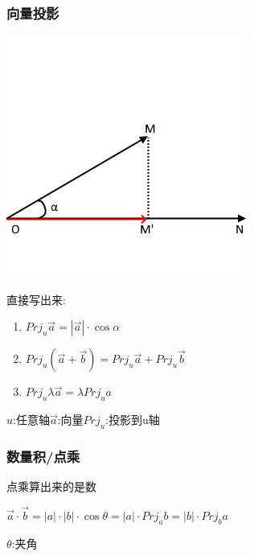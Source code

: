 \documentclass[UTF8,12pt]{ctexbook}
\newcommand{\projection}[1]{Prj_{#1}}
\begin{document}
{{{    \subsubsection{向量投影}{
      \includegraphics{resources/vector_axis_projection.png}

      直接写出来:
      \begin{enumerate}
        \item $\projection{u}\vec{a} = |\vec{a}|\cdot\cos\alpha$
        \item $\projection{u}(\vec{a} + \vec{b}) = \projection{u}\vec{a} + \projection{u}\vec{b}$
        \item $\projection{u}\lambda\vec{a} = \lambda\projection{u}a$
      \end{enumerate}

      $u$:任意轴\qquad$\vec{a}$:向量\qquad$\projection{u}$:投影到u轴

    }%

    \subsubsection{数量积/点乘}{
      点乘算出来的是数

      $\vec{a} \cdot \vec{b} = |a|\cdot|b|\cdot\cos\theta = |a|\cdot\projection{a}b = |b|\cdot\projection{b}a$

      $\theta$:夹角\\

}}}}
\end{document}
